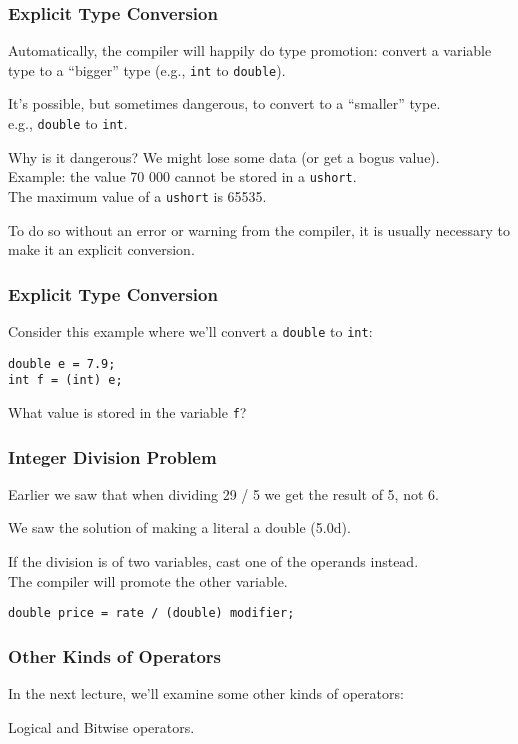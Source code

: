 \begin{frame}
\frametitle{Explicit Type Conversion}
Automatically, the compiler will happily do type promotion: convert a variable type to a ``bigger'' type (e.g., \texttt{int} to \texttt{double}).

It's possible, but sometimes dangerous, to convert to a ``smaller'' type.\\
\quad e.g., \texttt{double} to \texttt{int}.

Why is it dangerous? We might lose some data (or get a bogus value).\\
\quad Example: the value 70 000 cannot be stored in a \texttt{ushort}.\\
\quad The maximum value of a \texttt{ushort} is 65535.

To do so without an error or warning from the compiler, it is usually necessary to make it an explicit conversion.

\end{frame}

\begin{frame}[fragile]
\frametitle{Explicit Type Conversion}

Consider this example where we'll convert a \texttt{double} to \texttt{int}:

\begin{verbatim}
double e = 7.9;
int f = (int) e;
\end{verbatim}

What value is stored in the variable \texttt{f}?

\end{frame}

\begin{frame}
\frametitle{Integer Division Problem}
Earlier we saw that when dividing 29 / 5 we get the result of 5, not 6.

We saw the solution of making a literal a double (5.0d).

If the division is of two variables, cast one of the operands instead.\\
\quad The compiler will promote the other variable.

\texttt{double price = rate / (double) modifier;}

\end{frame}

\begin{frame}
\frametitle{Other Kinds of Operators}

In the next lecture, we'll examine some other kinds of operators:

Logical and Bitwise operators.

\end{frame}




